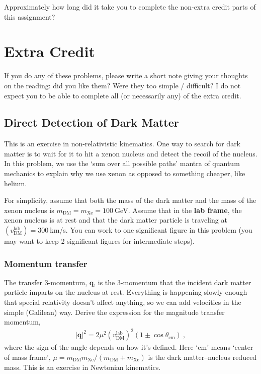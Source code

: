 \documentclass[12pt]{article}
\renewcommand{\vec}[1]{\mathbf{#1}} %
\begin{document}
Approximately how long did it take you to complete the non-extra credit parts of this assignment?




\section{Extra Credit}

If you do any of these problems, please write a short note giving your thoughts on the reading: did you like them? Were they too simple / difficult? I do not expect you to be able to complete all (or necessarily any) of the extra credit.

\subsection{Direct Detection of Dark Matter}

This is an exercise in non-relativistic kinematics. One way to search for dark matter is to wait for it to hit a xenon nucleus and detect the recoil of the nucleus. In this problem, we use the `sum over all possible paths' mantra of quantum mechanics to explain why we use xenon as opposed to something cheaper, like helium. 

For simplicity, assume that both the mass of the dark matter and the mass of the xenon nucleus is $m_{\text{DM}} = m_{\text{Xe}}=100~$GeV. Assume that in the \textbf{lab frame}, the xenon nucleus is at rest and that the dark matter particle is traveling at $(v_\text{DM}^\text{lab})=300~$km/s. You can work to one significant figure in this problem (you may want to keep 2 significant figures for intermediate steps). 

\subsubsection{Momentum transfer}
The transfer 3-momentum, $\vec q$, is the 3-momentum that the incident dark matter particle imparts on the nucleus at rest. Everything is happening slowly enough that special relativity doesn't affect anything, so we can add velocities in the simple (Galilean) way. Derive the expression for the magnitude transfer momentum, 
\begin{align}
	|\vec q|^2 = 2\mu^2 (v_\text{DM}^\text{lab})^2 (1\pm \cos \theta_\text{cm}) \ ,
\end{align}
where the sign of the angle depends on how it's defined. Here `cm' means `center of mass frame', $\mu = m_{\text{DM}}m_{\text{Xe}}/(m_{\text{DM}}+m_{\text{Xe}})$ is the dark matter--nucleus reduced mass. This is an exercise in Newtonian kinematics.
\end{document}

